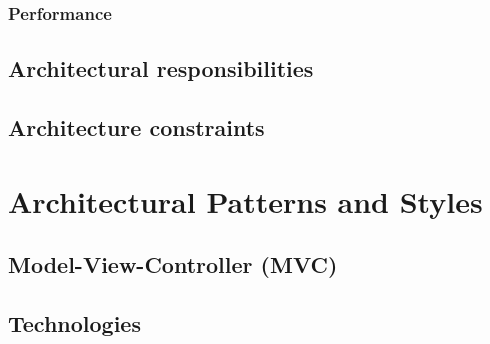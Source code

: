 \documentclass[a4paper,12pt,titlepage]{article}
\begin{document}
		\subsubsection{Performance}
	\subsection{Architectural responsibilities}
	
	\subsection{Architecture constraints}
	



\newpage
\section{Architectural Patterns and Styles}
	\subsection{Model-View-Controller (MVC)}
	
	
	\subsection{Technologies}
	
	
	

\end{document}
